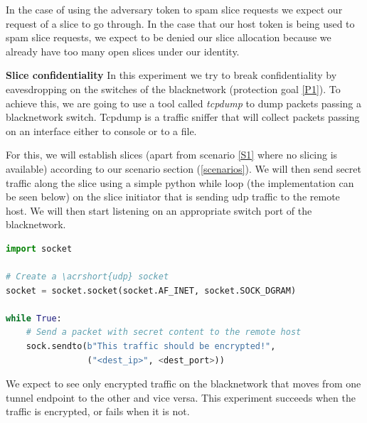 \begin{description}[style=multiline, labelwidth=0.7cm]
    In the case of using the adversary token to spam slice requests we expect our request of a slice to go through. In the case that our host token is being used to spam slice requests, we expect to be denied our slice allocation because we already have too many open slices under our identity.

    \item[\namedlabel{E4}{E4}] \textbf{Slice confidentiality} In this experiment we try to break confidentiality by eavesdropping on the switches of the \gls{blacknetwork} (protection goal \ref{P1}). To achieve this, we are going to use a tool called \textit{tcpdump} \cite{tcpdump} to dump packets passing a \gls{blacknetwork} switch. Tcpdump is a traffic sniffer that will collect packets passing on an interface either to console or to a file.

    For this, we will establish slices (apart from scenario \ref{S1} where no slicing is available) according to our scenario section (\ref{scenarios}). We will then send secret traffic along the slice using a simple python while loop (the implementation can be seen below) on the slice initiator that is sending \acrshort{udp} traffic to the remote host. We will then start listening on an appropriate switch port of the \gls{blacknetwork}.

    \begin{lstlisting}[language=python]
import socket

# Create a \acrshort{udp} socket
socket = socket.socket(socket.AF_INET, socket.SOCK_DGRAM)

while True:
    # Send a packet with secret content to the remote host
    sock.sendto(b"This traffic should be encrypted!",
                ("<dest_ip>", <dest_port>))
    \end{lstlisting}

    We expect to see only encrypted traffic on the \gls{blacknetwork} that moves from one tunnel endpoint to the other and vice versa. This experiment succeeds when the traffic is encrypted, or fails when it is not.




\end{description}
